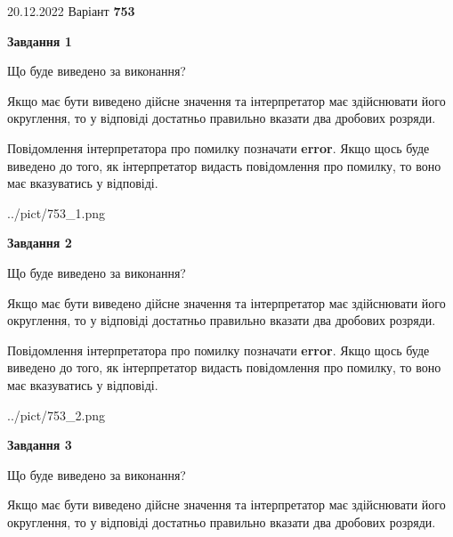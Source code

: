\documentclass[12pt, ukrainian]{article}
\begin{document}
{20.12.2022 Варіант \No \textbf { 753 }\par}
{
\begin {Large}

{\begin {center}\textbf{Завдання 1}\end {center}}\par
Що буде виведено за виконання? \par

Якщо має бути виведено дійсне значення та інтерпретатор має здійснювати його округлення, 
то у відповіді достатньо правильно вказати два дробових розряди.

Повідомлення інтерпретатора про помилку позначати \textbf{error}.
Якщо щось буде виведено до того, як інтерпретатор видасть повідомлення про помилку, 
то воно має вказуватись у відповіді. \par

\begin{center}
	{../pict/753_1.png}
\end{center}
\newpage

{\begin {center}\textbf{Завдання 2}\end {center}}\par
Що буде виведено за виконання? \par

Якщо має бути виведено дійсне значення та інтерпретатор має здійснювати його округлення, 
то у відповіді достатньо правильно вказати два дробових розряди.

Повідомлення інтерпретатора про помилку позначати \textbf{error}.
Якщо щось буде виведено до того, як інтерпретатор видасть повідомлення про помилку, 
то воно має вказуватись у відповіді. \par

\begin{center}
	{../pict/753_2.png}
\end{center}
\newpage

{\begin {center}\textbf{Завдання 3}\end {center}}\par
Що буде виведено за виконання? \par

Якщо має бути виведено дійсне значення та інтерпретатор має здійснювати його округлення, 
то у відповіді достатньо правильно вказати два дробових розряди.


\end{Large}}
\end{document}
